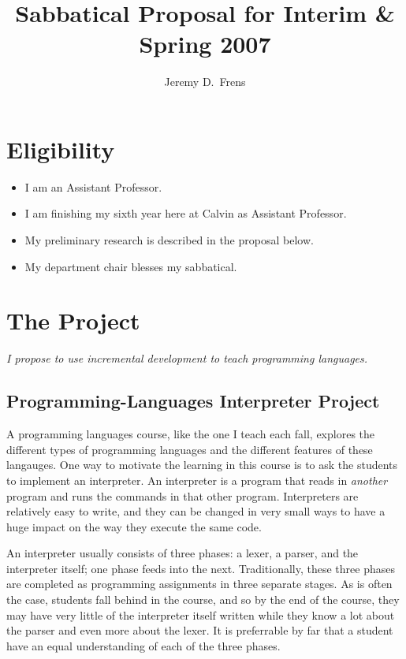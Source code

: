 \documentclass{article}
\title{Sabbatical Proposal for Interim \& Spring 2007}
\author{Jeremy D.\ Frens}
\date{}
\begin{document}
\maketitle

\section*{Eligibility}

\begin{itemize}
\item I am an Assistant Professor.
\item I am finishing my sixth year here at Calvin as Assistant Professor.
\item My preliminary research is described in the proposal below.
\item My department chair blesses my sabbatical.
\end{itemize}

\section*{The Project}

\emph{I propose to use incremental development to teach programming languages.}

\subsection*{Programming-Languages Interpreter Project}

A programming languages course, like the one I teach each fall, explores the different types of programming languages and the different features of these langauges.  One way to motivate the learning in this course is to ask the students to implement an interpreter.  An interpreter is a program that reads in \emph{another} program and runs the commands in that other program.  Interpreters are relatively easy to write, and they can be changed in very small ways to have a huge impact on the way they execute the same code.

An interpreter usually consists of three phases: a lexer, a parser, and the interpreter itself; one phase feeds into the next.  Traditionally, these three phases are completed as programming assignments in three separate stages.  As is often the case, students fall behind in the course, and so by the end of the course, they may have very little of the interpreter itself written while they know a lot about the parser and even more about the lexer.  It is preferrable by far that a student have an equal understanding of each of the three phases.
\end{document}
